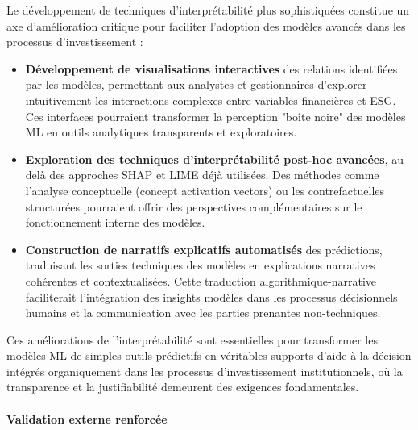 Le développement de techniques d'interprétabilité plus sophistiquées constitue un axe d'amélioration critique pour faciliter l'adoption des modèles avancés dans les processus d'investissement :
\begin{itemize}
    \item \textbf{Développement de visualisations interactives} des relations identifiées par les modèles, permettant aux analystes et gestionnaires d'explorer intuitivement les interactions complexes entre variables financières et ESG. Ces interfaces pourraient transformer la perception "boîte noire" des modèles ML en outils analytiques transparents et exploratoires.
    
    \item \textbf{Exploration des techniques d'interprétabilité post-hoc avancées}, au-delà des approches SHAP et LIME déjà utilisées. Des méthodes comme l'analyse conceptuelle (concept activation vectors) ou les contrefactuelles structurées pourraient offrir des perspectives complémentaires sur le fonctionnement interne des modèles.
    
    \item \textbf{Construction de narratifs explicatifs automatisés} des prédictions, traduisant les sorties techniques des modèles en explications narratives cohérentes et contextualisées. Cette traduction algorithmique-narrative faciliterait l'intégration des insights modèles dans les processus décisionnels humains et la communication avec les parties prenantes non-techniques.
\end{itemize}

Ces améliorations de l'interprétabilité sont essentielles pour transformer les modèles ML de simples outils prédictifs en véritables supports d'aide à la décision intégrés organiquement dans les processus d'investissement institutionnels, où la transparence et la justifiabilité demeurent des exigences fondamentales.

\paragraph{Validation externe renforcée} 

